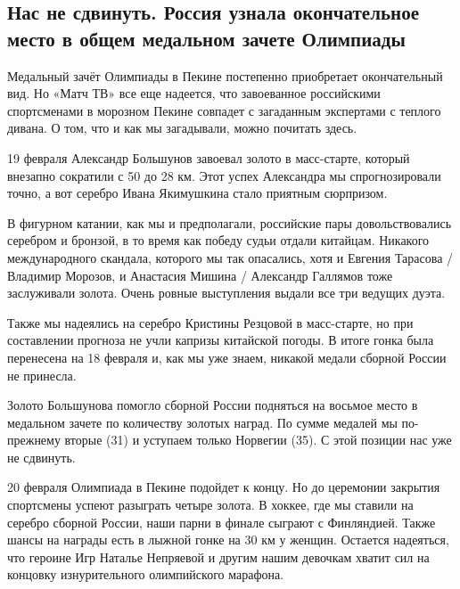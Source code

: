  
 
 
 
 
 
\subsection{Нас не сдвинуть. Россия узнала окончательное место в общем медальном зачете Олимпиады}
\label{sec:19_02_2022.stz.sport.ru.matchtv.1.rossia_olimpiada}
 

Медальный зачёт Олимпиады в Пекине постепенно приобретает окончательный вид. Но
«Матч ТВ» все еще надеется, что завоеванное российскими спортсменами в морозном
Пекине совпадет с загаданным экспертами с теплого дивана. О том, что и как мы
загадывали, можно почитать здесь.


19 февраля Александр Большунов завоевал золото в масс-старте, который внезапно
сократили с 50 до 28 км. Этот успех Александра мы спрогнозировали точно, а вот
серебро Ивана Якимушкина стало приятным сюрпризом.

В фигурном катании, как мы и предполагали, российские пары довольствовались
серебром и бронзой, в то время как победу судьи отдали китайцам. Никакого
международного скандала, которого мы так опасались, хотя и Евгения Тарасова /
Владимир Морозов, и Анастасия Мишина / Александр Галлямов тоже заслуживали
золота. Очень ровные выступления выдали все три ведущих дуэта.

Также мы надеялись на серебро Кристины Резцовой в масс-старте, но при
составлении прогноза не учли капризы китайской погоды. В итоге гонка была
перенесена на 18 февраля и, как мы уже знаем, никакой медали сборной России не
принесла.

Золото Большунова помогло сборной России подняться на восьмое место в медальном
зачете по количеству золотых наград. По сумме медалей мы по-прежнему вторые
(31) и уступаем только Норвегии (35). С этой позиции нас уже не сдвинуть.

20 февраля Олимпиада в Пекине подойдет к концу. Но до церемонии закрытия
спортсмены успеют разыграть четыре золота. В хоккее, где мы ставили на серебро
сборной России, наши парни в финале сыграют с Финляндией. Также шансы на
награды есть в лыжной гонке на 30 км у женщин. Остается надеяться, что героине
Игр Наталье Непряевой и другим нашим девочкам хватит сил на концовку
изнурительного олимпийского марафона.
